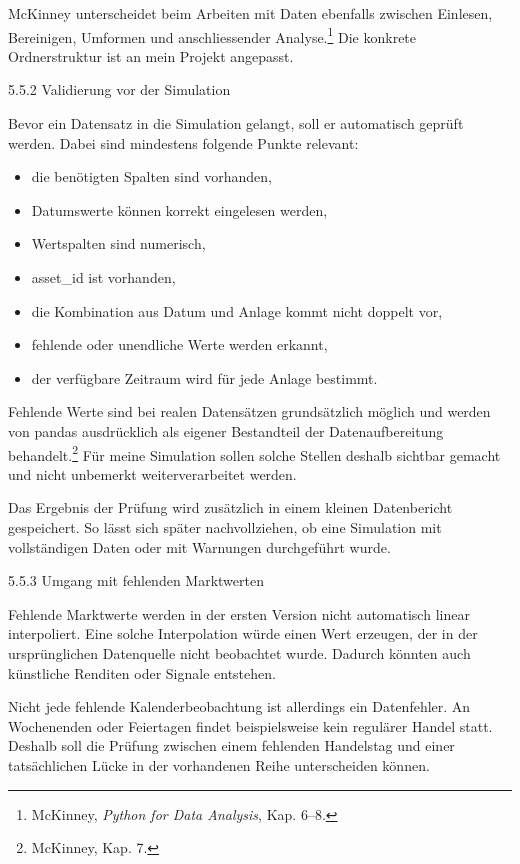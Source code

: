\documentclass[
  ngerman,
  a4paper,
  DIV=11,
  oneside]{scrreprt}
\providecommand{\tightlist}{%
  \setlength{\itemsep}{0pt}\setlength{\parskip}{0pt}}
\begin{document}
McKinney unterscheidet beim Arbeiten mit Daten ebenfalls zwischen
Einlesen, Bereinigen, Umformen und anschliessender Analyse.\footnote{McKinney,
  \emph{Python for Data Analysis}, Kap. 6--8.} Die konkrete
Ordnerstruktur ist an mein Projekt angepasst.

5.5.2 Validierung vor der Simulation

Bevor ein Datensatz in die Simulation gelangt, soll er automatisch
geprüft werden. Dabei sind mindestens folgende Punkte relevant:

\begin{itemize}
\tightlist
\item
  die benötigten Spalten sind vorhanden,
\item
  Datumswerte können korrekt eingelesen werden,
\item
  Wertspalten sind numerisch,
\item
  asset\_id ist vorhanden,
\item
  die Kombination aus Datum und Anlage kommt nicht doppelt vor,
\item
  fehlende oder unendliche Werte werden erkannt,
\item
  der verfügbare Zeitraum wird für jede Anlage bestimmt.
\end{itemize}

Fehlende Werte sind bei realen Datensätzen grundsätzlich möglich und
werden von pandas ausdrücklich als eigener Bestandteil der
Datenaufbereitung behandelt.\footnote{McKinney, Kap. 7.} Für meine
Simulation sollen solche Stellen deshalb sichtbar gemacht und nicht
unbemerkt weiterverarbeitet werden.

Das Ergebnis der Prüfung wird zusätzlich in einem kleinen Datenbericht
gespeichert. So lässt sich später nachvollziehen, ob eine Simulation mit
vollständigen Daten oder mit Warnungen durchgeführt wurde.

5.5.3 Umgang mit fehlenden Marktwerten

Fehlende Marktwerte werden in der ersten Version nicht automatisch
linear interpoliert. Eine solche Interpolation würde einen Wert
erzeugen, der in der ursprünglichen Datenquelle nicht beobachtet wurde.
Dadurch könnten auch künstliche Renditen oder Signale entstehen.

Nicht jede fehlende Kalenderbeobachtung ist allerdings ein Datenfehler.
An Wochenenden oder Feiertagen findet beispielsweise kein regulärer
Handel statt. Deshalb soll die Prüfung zwischen einem fehlenden
Handelstag und einer tatsächlichen Lücke in der vorhandenen Reihe
unterscheiden können.
\end{document}
